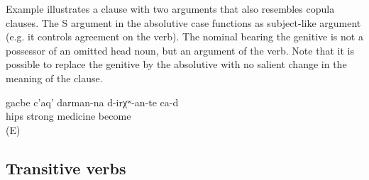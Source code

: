 Example  illustrates a clause with two arguments that also resembles copula clauses. The S argument in the absolutive case functions as subject-like argument (e.g. it controls agreement on the verb). The nominal bearing the genitive is not a possessor of an omitted head noun, but an argument of the verb. Note that it is possible to replace the genitive by the absolutive with no salient change in the meaning of the clause.
%
\begin{exe}
	\ex	\label{ex:The hips will be a strong medicine}
	\gll	gacbe	c'aq'	darman-na	d-irχʷ-an-te	ca-d\\
		hips	strong	medicine	become	\\
	\glt	{} (E)
\end{exe}



\subsection{Transitive verbs}
\label{sec:Transitive verbs}

